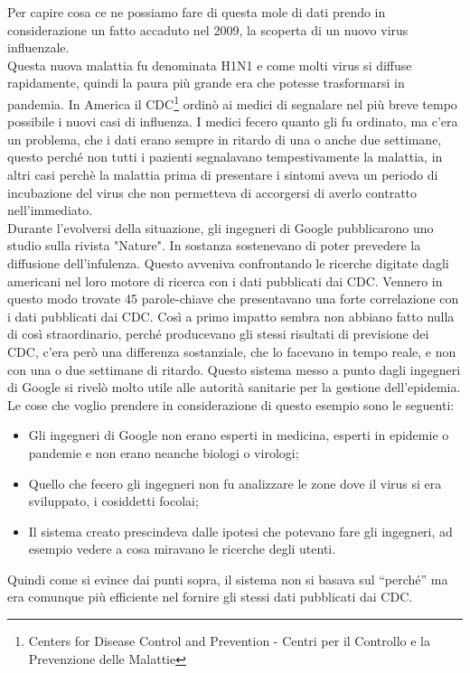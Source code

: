 Per capire cosa ce ne possiamo fare di questa mole di dati prendo in considerazione un fatto accaduto nel 2009, la scoperta di un nuovo virus influenzale.\\
Questa nuova malattia fu denominata H1N1 e come molti virus si diffuse rapidamente, quindi la paura pi\`u grande era che potesse trasformarsi in pandemia. In America il CDC\footnote{Centers for Disease Control and Prevention - Centri per il Controllo e la Prevenzione delle Malattie} ordin\`o ai medici di segnalare nel pi\`u breve tempo possibile i nuovi casi di influenza. I medici fecero quanto gli fu ordinato, ma c'era un problema, che i dati erano sempre in ritardo di una o anche due settimane, questo perch\'e non tutti i pazienti segnalavano tempestivamente la malattia, in altri casi perch\`e la malattia prima di presentare i sintomi aveva un periodo di incubazione del virus che non permetteva di accorgersi di averlo contratto nell'immediato.\\
Durante l'evolversi della situazione, gli ingegneri di Google pubblicarono uno studio sulla rivista "Nature". In sostanza sostenevano di poter prevedere la diffusione dell'infulenza. Questo avveniva confrontando le ricerche digitate dagli americani nel loro motore di ricerca con i dati pubblicati dai CDC. Vennero in questo modo trovate 45 parole-chiave che presentavano una forte correlazione con i dati pubblicati dai CDC. Cos\`i a primo impatto sembra non abbiano fatto nulla di cos\`i straordinario, perch\'e producevano gli stessi risultati di previsione dei CDC, c'era per\`o una differenza sostanziale, che lo facevano in tempo reale, e non con una o due settimane di ritardo. Questo sistema messo a punto dagli ingegneri di Google si rivel\`o molto utile alle autorit\`a sanitarie per la gestione dell'epidemia.\\
Le cose che voglio prendere in considerazione di questo esempio sono le seguenti:
\begin{itemize}
    \item Gli ingegneri di Google non erano esperti in medicina, esperti in epidemie o pandemie e non erano neanche biologi o virologi;
    \item Quello che fecero gli ingegneri non fu analizzare le zone dove il virus si era sviluppato, i cosiddetti focolai;
    \item Il sistema creato prescindeva dalle ipotesi che potevano fare gli ingegneri, ad esempio vedere a cosa miravano le ricerche degli utenti.
\end{itemize}
Quindi come si evince dai punti sopra, il sistema non si basava sul ``perch\'e'' ma era comunque pi\`u efficiente nel fornire gli stessi dati pubblicati dai CDC.\\

